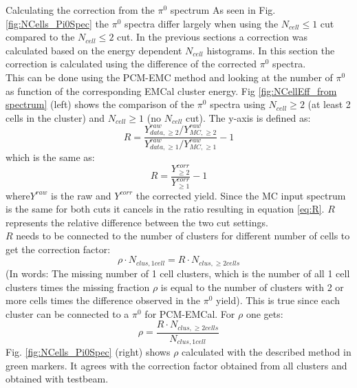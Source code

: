\documentclass[ALICE]{ALICE_analysis_notes}
\newcommand{\PZ}{$\pi^0$\xspace}
\begin{document}
\begin{section}{Calculating the correction from the \PZ spectrum}
	As seen in Fig. \ref{fig:NCells_Pi0Spec} the \PZ spectra differ largely when using the $N_{cell} \leq 1$ cut compared to the $N_{cell} \leq 2$ cut. In the previous sections a correction was calculated based on the energy dependent $N_{cell}$ histograms. In this section the correction is calculated using the difference of the corrected \PZ spectra. \\
	This can be done using the PCM-EMC method and looking at the number of \PZ as function of the corresponding EMCal cluster energy. Fig \ref{fig:NCellEff_from spectrum} (left) shows the comparison of the \PZ spectra using $N_{cell} \geq 2$ (at least 2 cells in the cluster) and $N_{cell} \geq 1$ (no $N_{cell}$ cut). The y-axis is defined as:
	\begin{equation}
	R =\frac{Y^{raw}_{data, \geq 2} / Y^{raw}_{MC, \geq 2}}{Y^{raw}_{data, \geq 1} / Y^{raw}_{MC, \geq 1}} - 1
	\label{eq:R}
	\end{equation}
	which is the same as:
	\begin{equation}
	R =\frac{Y^{corr}_{\geq2}}{Y^{corr}_{\geq1}} - 1
	\end{equation}
	where$Y^{raw}$ is the raw and $Y^{corr}$ the corrected yield. Since the MC input spectrum is the same for both cuts it cancels in the ratio resulting in equation \ref{eq:R}. $R$ represents the relative difference between the two cut settings.\\
	$R$ needs to be connected to the number of clusters for different number of cells to get the correction factor:
	\begin{equation}
	\rho \cdot N_{clus, 1 cell}= R \cdot N_{clus, \geq 2 cells}
	\end{equation}
	(In words: The missing number of 1 cell clusters, which is the number of all 1 cell clusters times the missing fraction $\rho$ is equal to the number of clusters with 2 or more cells times the difference observed in the \PZ yield). This is true since each cluster can be connected to a \PZ for PCM-EMCal. For $\rho$ one gets:
	\begin{equation}
	\rho = \frac{R \cdot N_{clus, \geq 2 cells}}{N_{clus, 1 cell}}
	\end{equation}
	Fig. \ref{fig:NCells_Pi0Spec} (right) shows $\rho$ calculated with the described method in green markers. It agrees with the correction factor obtained from all clusters and obtained with testbeam. \\
	
	
\end{section}
\end{document}
